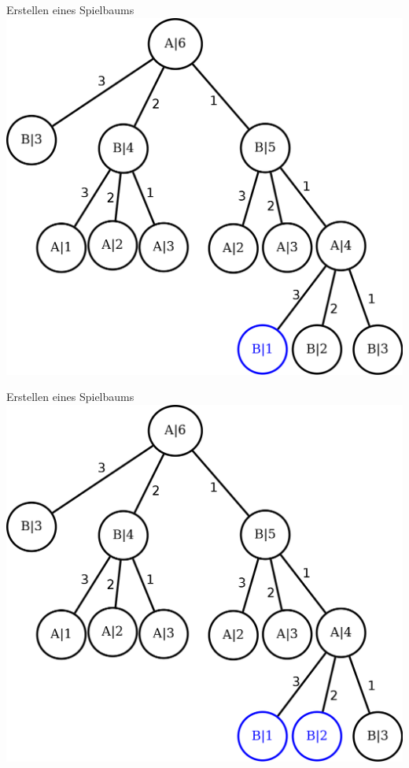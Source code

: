 \documentclass[18pt]{beamer}
\begin{document}
\begin{frame}{Erstellen eines Spielbaums}
\includegraphics[scale=0.4]{baum10.png}
\end{frame}

\begin{frame}{Erstellen eines Spielbaums}
\includegraphics[scale=0.4]{baum11.png}
\end{frame}
\end{document}
